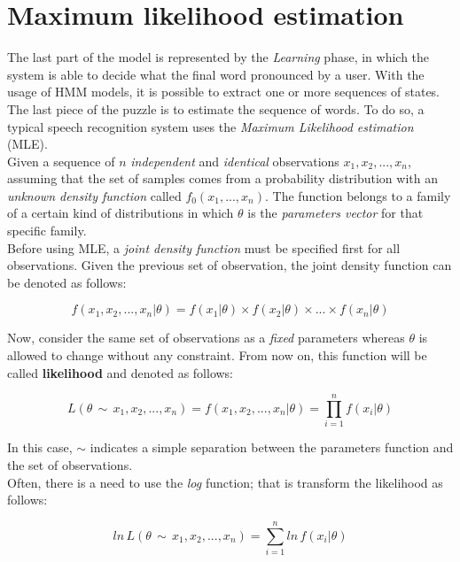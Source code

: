\section{Maximum likelihood estimation}
\label{sec:mle}
The last part of the model is represented by the \textit{Learning} phase, in which the system is able to decide what the final word pronounced by a user. With the usage of HMM models, it is possible to extract one or more sequences of states. The last piece of the puzzle is to estimate the sequence of words. To do so, a typical speech recognition system uses the \textit{Maximum Likelihood estimation} (MLE). \\

\noindent Given a sequence of $n$ \textit{independent} and \textit{identical} observations $x_{1}, x_{2}, ... , x_{n}$, assuming that the set of samples comes from a probability distribution with an \textit{unknown density function} called $f_{0}(x_{1}, ... , x_{n})$. The function belongs to a family of a certain kind of distributions in which $\theta$ is the \textit{parameters vector} for that specific family. \\

\noindent Before using MLE, a \textit{joint density function} must be specified first for all observations. Given the previous set of observation, the joint density function can be denoted as follows:

\begin{equation}
	f (x_{1}, x_{2}, ... , x_{n} | \theta) = f(x_{1} | \theta) \times f(x_{2} | \theta) \times ... \times f(x_{n} | \theta)
\end{equation}

\noindent Now, consider the same set of observations as a \textit{fixed} parameters whereas $\theta$ is allowed to change without any constraint. From now on, this function will be called \textbf{likelihood} and denoted as follows:

\begin{equation}
	L(\theta \, \sim \, x_{1}, x_{2}, ... , x_{n}) = f (x_{1}, x_{2}, ... , x_{n} | \theta) = \prod_{i=1}^{n} f (x_{i} | \theta)
\end{equation}

\noindent In this case, $\sim$ indicates a simple separation between the parameters function and the set of observations. \\
\noindent Often, there is a need to use the \textit{log} function; that is transform the likelihood as follows:

\begin{equation}
\label{eq:log-likelihood}
	ln \, L(\theta \, \sim \, x_{1}, x_{2}, ... , x_{n}) = \sum_{i=1}^{n} ln \, f(x_{i} | \theta)
\end{equation}

